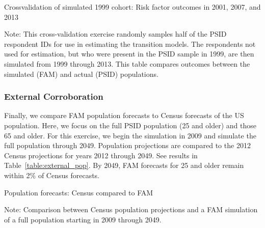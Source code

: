 \begin{table}[H]
\begin{threeparttable}
\caption{Crossvalidation of simulated 1999 cohort: Risk factor outcomes in 2001, 2007, and 2013}
\label{table:crossval_risk}
\centering
\footnotesize

\begin{tablenotes}
\footnotesize
\item Note: This cross-validation exercise randomly samples half of the PSID respondent IDs for use in estimating the transition models. The respondents not used for estimation, but who were present in the PSID sample in 1999, are then simulated from 1999 through 2013. This table compares outcomes between the simulated (FAM) and actual (PSID) populations.
\end{tablenotes}
\end{threeparttable}
\end{table}

\subsubsection{External Corroboration}
\noindent Finally, we compare FAM population forecasts to Census forecasts of the US population. Here, we focus on the full PSID population (25 and older) and those 65 and older. For this exercise, we begin the simulation in 2009 and simulate the full population through 2049. Population projections are compared to the 2012 Census projections for years 2012 through 2049. See results in Table~\ref{table:external_pop}. By 2049, FAM forecasts for 25 and older remain within 2\% of Census forecasts.\\

\begin{table}[H]
\begin{threeparttable}
\caption{Population forecasts: Census compared to FAM}
\label{table:external_pop}
\centering
\footnotesize

\begin{tablenotes}
\footnotesize
\item Note: Comparison between Census population projections and a FAM simulation of a full population starting in 2009 through 2049.
\end{tablenotes}
\end{threeparttable}
\end{table}

